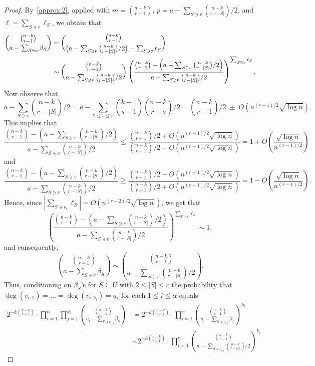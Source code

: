 \documentclass[12pt,reqno]{amsart}
\begin{document}
\begin{proof}
By~\ref{approx:2}, applied with $m=\binom{n-k}{r-1}$, $p=a-\sum_{S\ni v} {\binom{n-k}{r-|S|}}/{2}$, and $\ell = \sum_{S\ni v} \ell_S$, we obtain that
\begin{align*}
\binom{\binom{n-k}{r-1}}{a-\sum_{S\ni v}\beta_S}
&= \binom{\binom{n-k}{r-1}}{\big{(}a-\sum_{S\ni v} {\binom{n-k}{r-|S|}}/{2}\big{)}-\sum_{S\ni v} \ell_S}\\
& \sim \binom{\binom{n-k}{r-1}}{a-\sum_{S\ni v} {\binom{n-k}{r-|S|}}/{2}} \left( \frac{\binom{n-k}{r-1} - \left(a-\sum_{S\ni v} {\binom{n-k}{r-|S|}}/{2}\right)}{a-\sum_{S\ni v} {\binom{n-k}{r-|S|}}/{2}} \right)^{\sum_{S\ni v} \ell_S}.
\end{align*}
Now observe that 
\[
a-\sum_{S\ni v} {\binom{n-k}{r-|S|}}/{2}
= a - \sum_{2\le s \le r} \binom{k-1}{s-1} \binom{n-k}{r-s}/2
= \binom{n-k}{r-1}/2\;\pm\; O(n^{(r-1)/2}\sqrt{\log n}).
\]
This implies that
\[
\frac{\binom{n-k}{r-1} - \left(a-\sum_{S\ni v} {\binom{n-k}{r-|S|}}/{2}\right)}{a-\sum_{S\ni v} {\binom{n-k}{r-|S|}}/{2}} 
\le \frac{ {\binom{n-k}{r-1}}/{2} + O(n^{(r-1)/2}\sqrt{\log n}) }{  {\binom{n-k}{r-1}}/{2} - O(n^{(r-1)/2}\sqrt{\log n}) }
= 1 + O\left( \frac{\sqrt{\log n}}{n^{(r-1)/2}} \right)
\]
and
\[
\frac{\binom{n-k}{r-1} - \left(a-\sum_{S\ni v} {\binom{n-k}{r-|S|}}/{2}\right)}{a-\sum_{S\ni v} {\binom{n-k}{r-|S|}}/{2}}
\ge \frac{ {\binom{n-k}{r-1}}/{2} - O(n^{(r-1)/2}\sqrt{\log n}) }{  {\binom{n-k}{r-1}}/{2} + O(n^{(r-1)/2}\sqrt{\log n}) }
= 1 - O\left( \frac{\sqrt{\log n}}{n^{(r-1)/2}} \right).
\]
Hence, since $|\sum_{S\ni v_i} \ell_S| = O(n^{(r-2)/2}\sqrt{\log n})$, we get that 
\[
\left( \frac{\binom{n-k}{r-1} - \left(a-\sum_{S\ni v} {\binom{n-k}{r-|S|}}/{2}\right)}{a-\sum_{S\ni v} {\binom{n-k}{r-|S|}}/{2}} \right)^{\sum_{S\ni v} \ell_S} \sim 1,
\]
and consequently,
\[
\binom{\binom{n-k}{r-1}}{a-\sum_{S\ni v}\beta_S} \sim \binom{\binom{n-k}{r-1}}{a-\sum_{S\ni v} {\binom{n-k}{r-|S|}}/{2}}.
\]
Thus, conditioning on $\beta_S$'s for $S\subseteq U$ with $2\le |S| \le r$ the probability that $\deg(v_{i,1}) = \dots = \deg(v_{i,k_i})=a_i$ for each $1\le i\le \alpha$ equals 
\begin{align*}
2^{-k\binom{n-k}{r-1}} \cdot \prod_{i=1}^\alpha \prod_{j=1}^{k_i} \binom{\binom{n-k}{r-1}}{a_i-\sum_{S\ni v_{i,j}}\beta_S}
&= 2^{-k\binom{n-k}{r-1}} \cdot \prod_{i=1}^\alpha \binom{\binom{n-k}{r-1}}{a_i-\sum_{S\ni v_{i,1}}\beta_S}^{k_i} \\
&\sim 2^{-k\binom{n-k}{r-1}} \cdot \prod_{i=1}^\alpha \binom{\binom{n-k}{r-1}}{a_i-\sum_{S\ni v_{i,1}} {\binom{n-k}{r-|S|}}/{2}}^{k_i}
\end{align*}

\end{proof}
\end{document}

